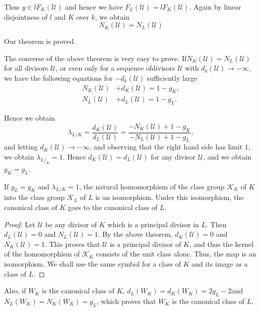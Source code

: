 Thus $y \in l F_K (\mathscr{U})$ and hence we have $F_L(\mathscr{U}) =
l F_K (\mathscr{U})$. Again by linear disjointness of $l$ and $K$ over
$k$, we obtain 
$$
N_K(\mathscr{U}) = N_L (\mathscr{U})
$$

Our theorem is proved.


The converse of the above theorem is very easy to prove. If\break $N_K
(\mathscr{U}) = N_L (\mathscr{U})$ for all divisors $\mathscr{U}$, or
even only for a sequence of\pageoriginale divisors $\mathscr{U}$ with
$d_k(\mathscr{U}) \to -\infty$, we have the following equations for
$-d_k(\mathscr{U})$ sufficiently large 
\begin{align*}
  N_K (\mathscr{U}) &+ d_K (\mathscr{U}) = 1-g_K,\\
  N_L (\mathscr{U}) &+ d_L (\mathscr{U})=1-g_L.
\end{align*}

Hence we obtain
$$
\lambda_{L/K}= \frac{d_K(\mathscr{U})}{d_L (\mathscr{U})} = \frac{-N_K
  (\mathscr{U}) + 1-g_K}{-N_L(\mathscr{U}) +1-g_L}, 
$$
and letting $d_K(\mathscr{U}) \to - \infty$, and observing that the
right hand side has limit $1$, we obtain $\lambda_{L/_K}=1$. Hence
$d_K(\mathscr{U}) = d_L (\mathscr{U})$ for any divisor $\mathscr{U}$,
and we obtain $g_K = g_L$. 

\begin{coro*}
  If $g_L = g_K$ and $\lambda_{L/K} = 1$, the natural homomorphism of
  the class group $\mathscr{K}_K$ of $K$ into the class group
  $\mathscr{K}_L$ of $L$ is an isomorphism. Under this isomorphism,
  the canonical class of $K$ goes to the canonical class of $L$. 
\end{coro*}

\begin{proof}
  Let $\mathscr{U}$ be any divisor of $K$ which is a principal divisor
  in $L$. Then $d_L(\mathscr{U}) = 0$ and $N_L(\mathscr{U}) = 1$. By
  the above theorem, $d_K(\mathscr{U})=0$ and
  $N_K(\mathscr{U})=1$. This proves that $\mathscr{U}$ is a principal
  divisor of $K$, and thus the kernel of the homomorphism of
  $\mathscr{K}_K$ consists of the unit class alone. Thus, the map is
  an isomorphism. We shall use the same symbol for a class of $K$ and
  its image as a class of $L$. 
\end{proof}

Also, if $W_K$ is the canonical class of $K$, $d_L(W_K) = d_K (W_K) =
2 g_L-2$\pageoriginale and $N_L(W_K) = N_K(W_K) = g_L$, which proves that $W_K$ is
the canonical class of $L$. 

